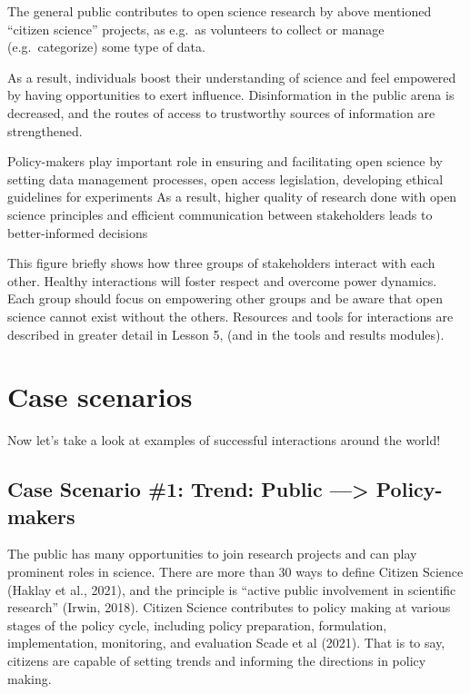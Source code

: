 \documentclass[
  letterpaper,
  DIV=11,
  numbers=noendperiod]{scrreport}
\begin{document}
The general public contributes to open science research by above
mentioned ``citizen science'' projects, as e.g.~as volunteers to collect
or manage (e.g.~categorize) some type of data.

As a result, individuals boost their understanding of science and feel
empowered by having opportunities to exert influence. Disinformation in
the public arena is decreased, and the routes of access to trustworthy
sources of information are strengthened.

Policy-makers play important role in ensuring and facilitating open
science by setting data management processes, open access legislation,
developing ethical guidelines for experiments As a result, higher
quality of research done with open science principles and efficient
communication between stakeholders leads to better-informed decisions

This figure briefly shows how three groups of stakeholders interact with
each other. Healthy interactions will foster respect and overcome power
dynamics. Each group should focus on empowering other groups and be
aware that open science cannot exist without the others. Resources and
tools for interactions are described in greater detail in Lesson 5, (and
in the tools and results modules).

\hypertarget{case-scenarios}{%
\section{Case scenarios}\label{case-scenarios}}

Now let's take a look at examples of successful interactions around the
world!

\hypertarget{case-scenario-1-trend-public-policy-makers}{%
\subsection{Case Scenario \#1: Trend: Public ---\textgreater{}
Policy-makers}\label{case-scenario-1-trend-public-policy-makers}}

The public has many opportunities to join research projects and can play
prominent roles in science. There are more than 30 ways to define
Citizen Science (Haklay et al., 2021), and the principle is ``active
public involvement in scientific research'' (Irwin, 2018). Citizen
Science contributes to policy making at various stages of the policy
cycle, including policy preparation, formulation, implementation,
monitoring, and evaluation Scade et al (2021). That is to say, citizens
are capable of setting trends and informing the directions in policy
making.
\end{document}
